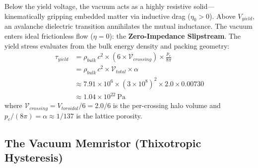 Below the yield voltage, the vacuum acts as a highly resistive solid---kinematically gripping embedded matter via inductive drag ($\eta_0 > 0$). Above $V_{yield}$, an avalanche dielectric transition annihilates the mutual inductance. The vacuum enters ideal frictionless flow ($\eta = 0$): the \textbf{Zero-Impedance Slipstream}. The yield stress evaluates from the bulk energy density and packing geometry:
\begin{align}
    \tau_{yield} &= \rho_{bulk}\, c^2 \times (6 \times \mathcal{V}_{crossing}) \times \frac{p_c}{8\pi} \nonumber \\
    &= \rho_{bulk}\, c^2 \times \mathcal{V}_{total} \times \alpha \nonumber \\
    &\approx 7.91 \times 10^{6} \times (3 \times 10^8)^2 \times 2.0 \times 0.00730 \nonumber \\
    &\approx 1.04 \times 10^{22}\ \text{Pa}
\end{align}
where $\mathcal{V}_{crossing} = V_{toroidal}/6 = 2.0/6$ is the per-crossing halo volume and $p_c/(8\pi) = \alpha \approx 1/137$ is the lattice porosity.

\subsection{The Vacuum Memristor (Thixotropic Hysteresis)}

